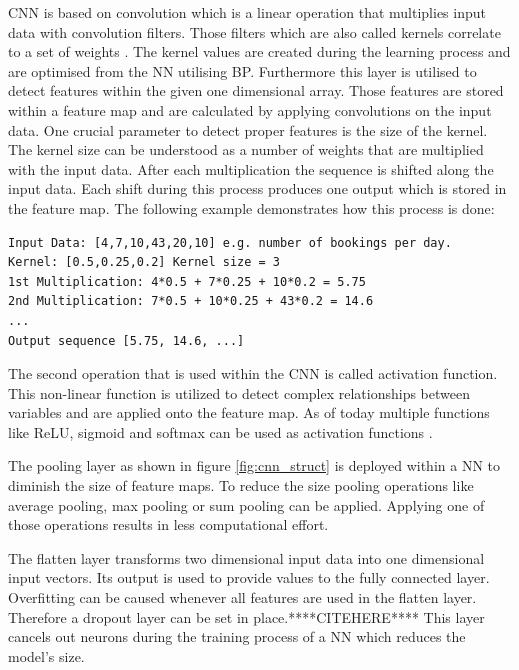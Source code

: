 CNN is based on convolution which is a linear operation that multiplies input data with convolution filters. Those filters which are also called kernels correlate to a set of weights \cite{cnn_vechicle}. The kernel values are created during the learning process and are optimised from the NN utilising BP. Furthermore this layer is utilised to detect features within the given one dimensional array. Those features are stored within a feature map and are calculated by applying convolutions on the input data. One crucial parameter to detect proper features is the size of the kernel. The kernel size can be understood as a number of weights that are multiplied with the input data. After each multiplication the sequence is shifted along the input data. Each shift during this process produces one output which is stored in the feature map. The following example demonstrates how this process is done:\cite{1d_cnn}
\begin{lstlisting}
Input Data: [4,7,10,43,20,10] e.g. number of bookings per day. 
Kernel: [0.5,0.25,0.2] Kernel size = 3
1st Multiplication: 4*0.5 + 7*0.25 + 10*0.2 = 5.75
2nd Multiplication: 7*0.5 + 10*0.25 + 43*0.2 = 14.6
...
Output sequence [5.75, 14.6, ...]
\end{lstlisting}
The second operation that is used within the CNN is called activation function. This non-linear function is utilized to detect complex relationships between variables and are applied onto the feature map. As of today multiple functions like ReLU, sigmoid and softmax can be used as activation functions \cite{cnn_basic3}.

The pooling layer as shown in figure \ref{fig:cnn_struct} is deployed within a NN to diminish the size of feature maps. To reduce the size pooling operations like average pooling, max pooling or sum pooling can be applied. Applying one of those operations results in less computational effort.\cite{cnn_basic}


The flatten layer transforms two dimensional input data into one dimensional input vectors. Its output is used to provide values to the fully connected layer. Overfitting can be caused whenever all features are used in the flatten layer. Therefore a dropout layer can be set in place.****CITEHERE**** This layer cancels out neurons during the training process of a NN which reduces the model's size. 

